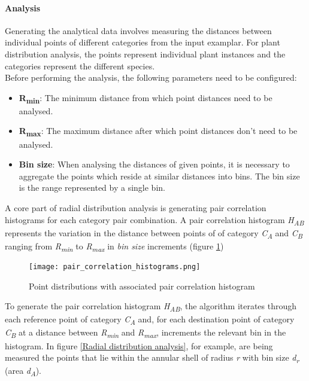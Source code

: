 \paragraph{Analysis}
Generating the analytical data involves measuring the distances between individual points of different categories from the input examplar. For plant distribution analysis, the points represent individual plant instances and the categories represent the different species.\\

Before performing the analysis, the following parameters need to be configured:
\begin{itemize}
\item \textbf{R\textsubscript{min}}: The minimum distance from which point distances need to be analysed.\\
\item \textbf{R\textsubscript{max}}: The maximum distance after which point distances don't need to be analysed.\\
\item \textbf{Bin size}: When analysing the distances of given points, it is necessary to aggregate the points which reside at similar distances into bins. The bin size is the range represented by a single bin.\\
\end{itemize}

A core part of radial distribution analysis is generating pair correlation histograms for each category pair combination. A pair correlation histogram \textit{H\textsubscript{AB}} represents the variation in the distance between points of of category \textit{C\textsubscript{A}} and \textit{C\textsubscript{B}} ranging from \textit{R\textsubscript{min}} to \textit{R\textsubscript{max}} in \textit{bin size} increments (figure \ref{Pair Correlation Histograms}) \\

\begin{figure}[h]
  \centering
	\label{Pair Correlation Histograms}
	\texttt{[image: pair\_correlation\_histograms.png]}
	\caption{Point distributions with associated pair correlation histogram \cite{Emilien2014}}
\end{figure}

To generate the pair correlation histogram \textit{H\textsubscript{AB}}, the algorithm iterates through each reference point of category \textit{C\textsubscript{A}} and, for each destination point of category \textit{C\textsubscript{B}} at a distance between \textit{R\textsubscript{min}} and \textit{R\textsubscript{max}}, increments the relevant bin in the histogram. In figure \ref{Radial distribution analysis}, for example, are being measured the points that lie within the annular shell of radius \textit{r} with bin size \textit{d\textsubscript{r}} (area \textit{d\textsubscript{A}}). 

